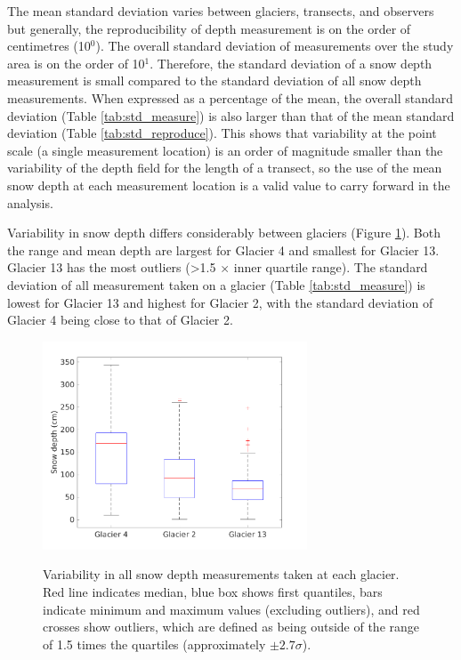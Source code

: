 \documentclass{sfuthesis}
\begin{document}
\begin{appendices}
The mean standard deviation varies between glaciers, transects, and observers but  generally, the reproducibility of depth measurement is on the order of centimetres (10$^0$). The overall standard deviation of measurements over the study area is on the order of 10$^1$. Therefore, the standard deviation of a snow depth measurement is small compared to the standard deviation of all snow depth measurements. When expressed as a percentage of the mean, the overall standard deviation (Table \ref{tab:std_measure}) is also larger than that of the mean standard deviation (Table \ref{tab:std_reproduce}). This shows that variability at the point scale (a single measurement location) is an order of magnitude smaller than the variability of the depth field for the length of a transect, so the use of the mean snow depth at each measurement location is a valid value to carry forward in the analysis. 

Variability in snow depth differs considerably between glaciers (Figure \ref{fig:box_depth}). Both the range and mean depth are largest for Glacier 4 and smallest for Glacier 13. Glacier 13 has the most outliers (\textgreater 1.5 $\times$ inner quartile range). The standard deviation of all measurement taken on a glacier (Table \ref{tab:std_measure}) is lowest for Glacier 13 and highest for Glacier 2, with the standard deviation of Glacier 4 being close to that of Glacier 2. 


\begin{figure} 
\centering
	\includegraphics[width = 0.7\textwidth]{box_depth.png}\\
	\caption[]{Variability in all snow depth measurements taken at each glacier. Red line indicates median, blue box shows first quantiles, bars indicate minimum and maximum values (excluding outliers), and red crosses show outliers, which are defined as being outside of the range of 1.5 times the quartiles (approximately $\pm2.7\sigma$).}
	\label{fig:box_depth}
\end{figure}


\end{appendices}
\end{document}
